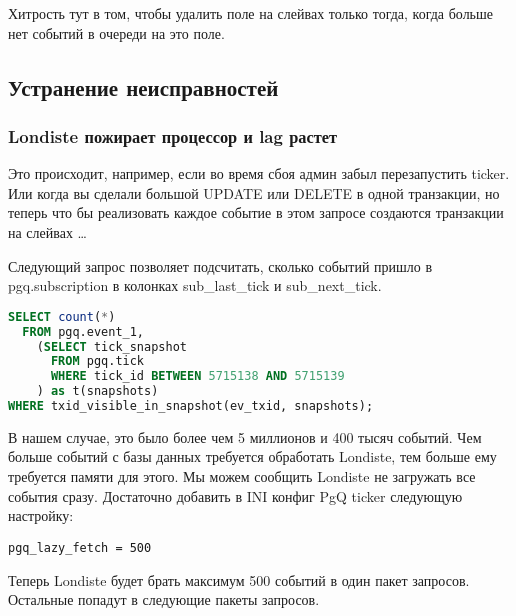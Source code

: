 Хитрость тут в том, чтобы удалить поле на слейвах только тогда, когда больше нет событий в очереди на это поле.


\subsection{Устранение неисправностей}

\subsubsection{Londiste пожирает процессор и lag растет}
Это происходит, например, если во время сбоя админ забыл перезапустить ticker. Или когда вы сделали большой
UPDATE или DELETE в одной транзакции, но теперь что бы реализовать каждое событие в этом запросе создаются
транзакции на слейвах \dots

Следующий запрос позволяет подсчитать, сколько событий пришло в pgq.subscription в колонках sub\_last\_tick и sub\_next\_tick.
\begin{lstlisting}[language=SQL,label=lst:londiste24,caption=Устранение неисправностей]
SELECT count(*)
  FROM pgq.event_1,
    (SELECT tick_snapshot
      FROM pgq.tick
      WHERE tick_id BETWEEN 5715138 AND 5715139
    ) as t(snapshots)
WHERE txid_visible_in_snapshot(ev_txid, snapshots);
\end{lstlisting}

В нашем случае, это было более чем 5 миллионов и 400 тысяч событий. Чем больше событий
с базы данных требуется обработать Londiste, тем больше ему требуется памяти для этого. Мы можем сообщить
Londiste не загружать все события сразу. Достаточно добавить в INI конфиг PgQ ticker следующую настройку:
\begin{lstlisting}[label=lst:londiste25,caption=Устранение неисправностей]
pgq_lazy_fetch = 500
\end{lstlisting}

Теперь Londiste будет брать максимум 500 событий в один пакет запросов. Остальные попадут в следующие пакеты запросов.